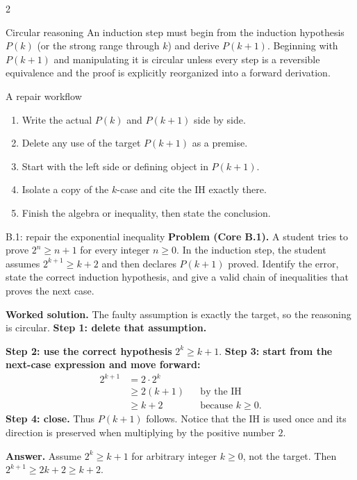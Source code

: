 \documentclass[10pt]{article}
\begin{document}
\begin{multicols}{2}
\begin{definitionbox}{Circular reasoning}
An induction step must begin from the induction hypothesis $P(k)$ (or the
strong range through $k$) and derive $P(k+1)$. Beginning with $P(k+1)$ and
manipulating it is circular unless every step is a reversible equivalence and
the proof is explicitly reorganized into a forward derivation.
\end{definitionbox}

\begin{methodbox}{A repair workflow}
\begin{enumerate}
  \item Write the actual $P(k)$ and $P(k+1)$ side by side.
  \item Delete any use of the target $P(k+1)$ as a premise.
  \item Start with the left side or defining object in $P(k+1)$.
  \item Isolate a copy of the $k$-case and cite the IH exactly there.
  \item Finish the algebra or inequality, then state the conclusion.
\end{enumerate}
\end{methodbox}

\begin{workedbox}{B.1: repair the exponential inequality}
\textbf{Problem (Core B.1).} A student tries to prove $2^n\ge n+1$ for
every integer $n\ge0$. In the induction step, the student assumes
$2^{k+1}\ge k+2$ and then declares $P(k+1)$ proved. Identify the error,
state the correct induction hypothesis, and give a valid chain of inequalities
that proves the next case.

\textbf{Worked solution.} The faulty assumption is exactly the target,
so the reasoning is circular. \textbf{Step 1: delete that
assumption.}

\textbf{Step 2: use the correct hypothesis} $2^k\ge k+1$.
\textbf{Step 3: start from the next-case expression and move forward:}
\begin{align*}
2^{k+1}&=2\cdot2^k\\
       &\ge2(k+1) &&\text{by the IH}\\
       &\ge k+2 &&\text{because }k\ge0.
\end{align*}
\textbf{Step 4: close.} Thus $P(k+1)$ follows. Notice that the IH is used once and its direction is
preserved when multiplying by the positive number $2$.

\textbf{Answer.} Assume $2^k\ge k+1$ for arbitrary integer $k\ge0$, not
the target. Then $2^{k+1}\ge2k+2\ge k+2$.
\end{workedbox}


\end{multicols}
\end{document}
